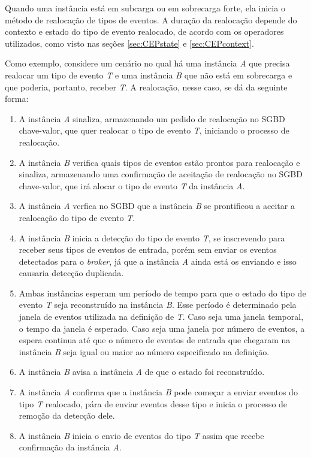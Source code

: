 Quando uma instância está em subcarga ou em sobrecarga forte, ela inicia o método de realocação de tipos de eventos. A duração da realocação depende do contexto e estado do tipo de evento realocado, de acordo com os operadores utilizados, como visto nas seções \ref{sec:CEPstate} e \ref{sec:CEPcontext}.

Como exemplo, considere um cenário no qual há uma instância \textit{A} que precisa realocar um tipo de evento \textit{T} e uma instância \textit{B} que não está em sobrecarga e que poderia, portanto, receber \textit{T}. A realocação, nesse caso, se dá da seguinte forma: 
\begin{enumerate}
    \item  A instância \textit{A} sinaliza, armazenando um pedido de realocação no SGBD chave-valor, que quer realocar o tipo de evento \textit{T}, iniciando o processo de realocação.
    \item A instância \textit{B} verifica quais tipos de eventos estão prontos para realocação e sinaliza, armazenando uma confirmação de aceitação de realocação no SGBD chave-valor, que irá alocar o tipo de evento \textit{T} da instância \textit{A}. 
    \item A instância \textit{A} verfica no SGBD que a instância \textit{B} se prontificou a aceitar a realocação do tipo de evento \textit{T}.%
    \item A instância \textit{B} inicia a detecção do tipo de evento \textit{T}, se inscrevendo para receber seus tipos de eventos de entrada, porém sem enviar os eventos detectados para o \textit{broker}, já que a instância \textit{A} ainda está os enviando e isso causaria detecção duplicada.
    \item Ambas instâncias esperam um período de tempo para que o estado do tipo de evento \textit{T} seja reconstruído na instância \textit{B}. Esse período é determinado pela janela de eventos utilizada na definição de \textit{T}. Caso seja uma janela temporal, o tempo da janela é esperado. Caso seja uma janela por número de eventos, a espera continua até que o número de eventos de entrada que chegaram na instância \textit{B} seja igual ou maior ao número especificado na definição.
    \item A instância \textit{B} avisa a instância \textit{A} de que o estado foi reconstruído.
    \item A instância \textit{A} confirma que a instância \textit{B} pode começar a enviar eventos do tipo \textit{T} realocado, pára de enviar eventos desse tipo e inicia o processo de remoção da detecção dele.
    \item A instância \textit{B} inicia o envio de eventos do tipo \textit{T} assim que recebe confirmação da instância \textit{A}.
\end{enumerate}

